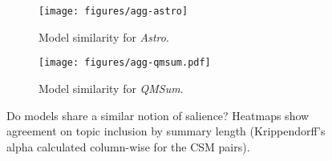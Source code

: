 \begin{figure*}[t]
\centering

    \begin{subfigure}[b]{\textwidth}
    \texttt{[image: figures/agg-astro]}
    \caption{Model similarity for \emph{Astro}.}
    \label{fig:agg-astro}
    \end{subfigure}

    \vspace{0.5cm}

    \begin{subfigure}[b]{\textwidth}
    \texttt{[image: figures/agg-qmsum.pdf]}
    \caption{Model similarity for \emph{QMSum}.}
    \label{fig:agg-qmsum}
    \end{subfigure}

\caption{Do models share a similar notion of salience? Heatmaps show agreement on topic inclusion by summary length (Krippendorff's alpha calculated column-wise for the CSM pairs).}
\label{fig:agg-astro-qmsum}
\end{figure*}

